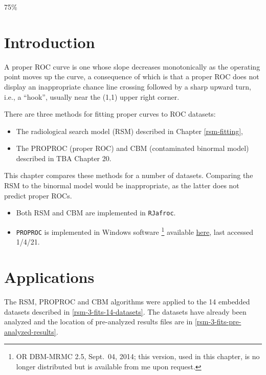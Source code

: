 \documentclass[
]{book}
\providecommand{\tightlist}{%
  \setlength{\itemsep}{0pt}\setlength{\parskip}{0pt}}
\begin{document}
75\%

\hypertarget{rsm-3-fits-intro}{%
\section{Introduction}\label{rsm-3-fits-intro}}

A proper ROC curve is one whose slope decreases monotonically as the operating point moves up the curve, a consequence of which is that a proper ROC does not display an inappropriate chance line crossing followed by a sharp upward turn, i.e., a ``hook'', usually near the (1,1) upper right corner.

There are three methods for fitting proper curves to ROC datasets:

\begin{itemize}
\tightlist
\item
  The radiological search model (RSM) described in Chapter \ref{rsm-fitting},
\item
  The PROPROC (proper ROC) and CBM (contaminated binormal model) described in TBA Chapter 20.
\end{itemize}

This chapter compares these methods for a number of datasets. Comparing the RSM to the binormal model would be inappropriate, as the latter does not predict proper ROCs.

\begin{itemize}
\tightlist
\item
  Both RSM and CBM are implemented in \texttt{RJafroc}.
\item
  \texttt{PROPROC} is implemented in Windows software \footnote{OR DBM-MRMC 2.5, Sept.~04, 2014; this version, used in this chapter, is no longer distributed but is available from me upon request.} available \href{https://perception.lab.uiowa.edu/OR-DBM-MRMC-252}{here}, last accessed 1/4/21.
\end{itemize}

\hypertarget{rsm-3-fits-applications}{%
\section{Applications}\label{rsm-3-fits-applications}}

The RSM, PROPROC and CBM algorithms were applied to the 14 embedded datasets described in \ref{rsm-3-fits-14-datasets}. The datasets have already been analyzed and the location of pre-analyzed results files are in \ref{rsm-3-fits-pre-analyzed-results}.
\end{document}
